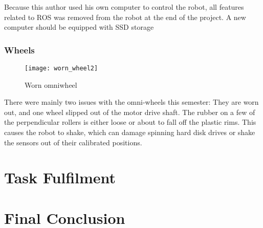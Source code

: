 Because this author used his own computer to control the robot, all features related to \ac{ROS} was removed from the robot at the end of the project. A new computer should be equipped with \ac{SSD} storage

\subsubsection{Wheels}

\begin{wrapfigure}{r}{0.5\textwidth}
	\vspace{-20pt}
	\begin{center}
		\texttt{[image: worn\_wheel2]}
	\end{center}
	
	\caption{Worn omniwheel}
	\label{fig:worn_wheel}
\end{wrapfigure}

There were mainly two issues with the omni-wheels this semester: They are worn out, and one wheel slipped out of the motor drive shaft. The rubber on a few of the perpendicular rollers is either loose or about to fall off the plastic rims. This causes the robot to shake, which can damage spinning hard disk drives or shake the sensors out of their calibrated positions.   


\section{Task Fulfilment}

\section{Final Conclusion}